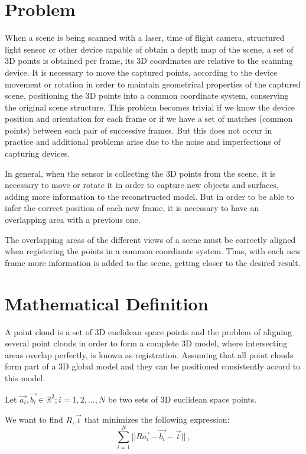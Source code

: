 \section{Problem}

When a scene is being scanned with a laser, time of flight camera, structured 
light sensor or other device capable of obtain a depth map of the scene,
 a set of 3D points is obtained per frame, its 3D coordinates 
are relative to the scanning device. It is necessary to move the captured points, 
according to the device movement or rotation in order to maintain geometrical properties of the captured scene,
 positioning the 3D points into a common coordinate system, conserving 
the original scene structure. This problem becomes trivial if we know the device position and orientation 
for each frame or if we have a set of matches (common points)  between each pair of successive 
frames. But this does not occur in practice and additional problems arise due 
to the noise and imperfections of capturing devices.


In general, when the sensor is collecting the 3D points from the scene, 
 it is necessary to move or rotate it in order to capture new objects and surfaces,
 adding more information to the reconstructed model. But in order to be 
able to infer the correct position of each new frame, it is necessary to have an overlapping area with a previous one. 
 
The overlapping areas of the different views of a scene must be correctly 
aligned when registering the points in a common coordinate system. 
Thus, with each new frame more information is added to the scene, 
getting closer to the desired result. 

\section{Mathematical Definition}

A point cloud is a set of 3D euclidean space points and the problem of aligning several point clouds 
in order to form a complete 3D model, where intersecting areas overlap perfectly, 
is known as registration. Assuming that all point clouds form part of a 3D global model and they can be 
 positioned  consistently accord to this model.

Let  ${\vec{a_i}},{\vec{b_i}} \in \mathbb{R}^3;i = 1,2,...,N$ be two sets of 3D euclidean space points.

We want to find $R,\vec{t}$ that minimizes the following expression:
$$
\sum\limits_{i=1}^N || R\vec{a_i} - \vec{b_i} - \vec{t} || \ ,
$$

